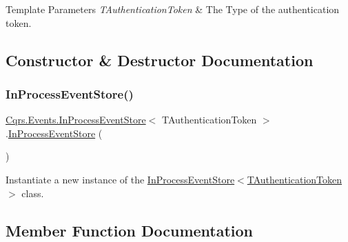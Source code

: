 \begin{DoxyTemplParams}{Template Parameters}
{\em T\+Authentication\+Token} & The Type of the authentication token.\\
\hline
\end{DoxyTemplParams}


\subsection{Constructor \& Destructor Documentation}
\mbox{\label{classCqrs_1_1Events_1_1InProcessEventStore_a81534fc0086e307f46051c26111c47ab_a81534fc0086e307f46051c26111c47ab}} 
\subsubsection{\texorpdfstring{In\+Process\+Event\+Store()}{InProcessEventStore()}}
{\footnotesize\ttfamily \hyperlink{classCqrs_1_1Events_1_1InProcessEventStore}{Cqrs.\+Events.\+In\+Process\+Event\+Store}$<$ T\+Authentication\+Token $>$.\hyperlink{classCqrs_1_1Events_1_1InProcessEventStore}{In\+Process\+Event\+Store} (\begin{DoxyParamCaption}{ }\end{DoxyParamCaption})}



Instantiate a new instance of the \hyperlink{classCqrs_1_1Events_1_1InProcessEventStore_a81534fc0086e307f46051c26111c47ab_a81534fc0086e307f46051c26111c47ab}{In\+Process\+Event\+Store$<$\+T\+Authentication\+Token$>$} class. 



\subsection{Member Function Documentation}
\mbox{\label{classCqrs_1_1Events_1_1InProcessEventStore_a1a57a9059c5489fd891b479468b7e9ed_a1a57a9059c5489fd891b479468b7e9ed}} 

